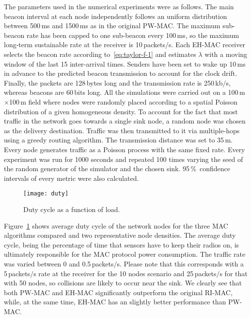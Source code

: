 \documentclass[journal,english,twocolumn,10pt,letterpaper]{IEEEtran}
\begin{document}
The parameters used in the numerical experiments were as follows. The main
beacon interval at each node independently follows an uniform distribution
between 500$\,$ms and 1500$\,$ms as in the original PW-MAC. The maximum
sub-beacon rate has been capped to one sub-beacon every 100$\,$ms, so the
maximum long-term sustainable rate at the receiver is 10$\,$packets$/$s. Each
EH-MAC receiver selects the beacon rate according to~\eqref{eq:taylor-f-1} and
estimates $\lambda$ with a moving window of the last 15 inter-arrival
times. Senders have been set to wake up 10$\,$ms in advance to the predicted
beacon transmission to account for the clock drift. Finally, the packets are
128$\,$bytes long and the transmission rate is 250$\,$kb$/$s, whereas beacons
are 60$\,$bits long.
All the simulations were carried out on a 100$\,$m$\times$100$\,$m field where
nodes were randomly placed according to a spatial Poisson distribution of a
given homogeneous density. To account for the fact that most traffic in the
network goes towards a single sink node, a random node was chosen as the
delivery destination. Traffic was then transmitted to it via multiple-hops
using a greedy routing algorithm.
The transmission distance was set to 35$\,$m. Every node generates traffic as
a Poisson process with the same fixed rate. Every experiment was run
for 1000 seconds and repeated 100 times varying the seed of the random
generator of the simulator and the chosen sink. 95$\,$\%~confidence intervals
of every metric were also calculated.

\begin{figure}
  \centering
  \texttt{[image: duty]}
  \caption{Duty cycle as a function of load.}
  \label{fig:duty-cycle}
\end{figure}
Figure~\ref{fig:duty-cycle} shows average duty cycle of the network nodes for
the three MAC algorithms compared and two representative node densities. The
average duty cycle, being the percentage of time that sensors have to keep
their radios on, is ultimately responsible for the MAC protocol power
consumption. The traffic rate was varied between 0 and 0.5$\,$packets$/$s.
Please note that this corresponds with a 5$\,$packets$/$s rate at the receiver
for the 10 nodes scenario and 25$\,$packets$/$s for that with 50 nodes, so
collisions are likely to occur near the sink. We clearly see that both PW-MAC
and EH-MAC significantly outperform the original RI-MAC, while, at the same
time, EH-MAC has an slightly better performance than PW-MAC.
\end{document}
